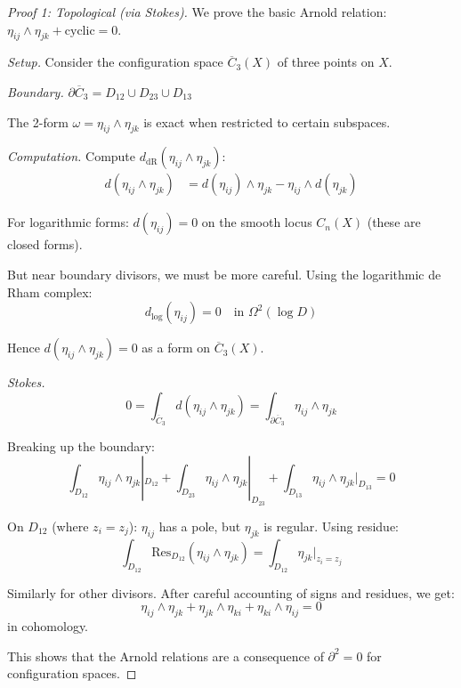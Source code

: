 \begin{proof}[Proof 1: Topological (via Stokes)]
We prove the basic Arnold relation: $\eta_{ij} \wedge \eta_{jk} + \text{cyclic} = 0$.

\emph{Setup.} Consider the configuration space $\overline{C}_3(X)$ of three points on $X$.

\emph{Boundary.} $\partial\overline{C}_3 = D_{12} \cup D_{23} \cup D_{13}$

The 2-form $\omega = \eta_{ij} \wedge \eta_{jk}$ is exact when restricted to certain subspaces.

\emph{Computation.} Compute $d_{\text{dR}}(\eta_{ij} \wedge \eta_{jk})$:
\begin{align*}
d(\eta_{ij} \wedge \eta_{jk}) &= d(\eta_{ij}) \wedge \eta_{jk} - \eta_{ij} \wedge d(\eta_{jk})
\end{align*}

For logarithmic forms: $d(\eta_{ij}) = 0$ on the smooth locus $C_n(X)$ (these are closed forms).

But near boundary divisors, we must be more careful. Using the logarithmic de Rham complex:
\[d_{\log}(\eta_{ij}) = 0 \quad \text{in } \Omega^2(\log D)\]

Hence $d(\eta_{ij} \wedge \eta_{jk}) = 0$ as a form on $\overline{C}_3(X)$.

\emph{Stokes.}
\[0 = \int_{\overline{C}_3} d(\eta_{ij} \wedge \eta_{jk}) = \int_{\partial\overline{C}_3} \eta_{ij} \wedge \eta_{jk}\]

Breaking up the boundary:
\[\int_{D_{12}} \eta_{ij} \wedge \eta_{jk}|_{D_{12}} + \int_{D_{23}} \eta_{ij} \wedge \eta_{jk}|_{D_{23}} + \int_{D_{13}} \eta_{ij} \wedge \eta_{jk}|_{D_{13}} = 0\]

On $D_{12}$ (where $z_i = z_j$): $\eta_{ij}$ has a pole, but $\eta_{jk}$ is regular.
Using residue:
\[\int_{D_{12}} \text{Res}_{D_{12}}(\eta_{ij} \wedge \eta_{jk}) = \int_{D_{12}} \eta_{jk}|_{z_i=z_j}\]

Similarly for other divisors. After careful accounting of signs and residues, we get:
\[\eta_{ij} \wedge \eta_{jk} + \eta_{jk} \wedge \eta_{ki} + \eta_{ki} \wedge \eta_{ij} = 0\]
in cohomology.

This shows that the Arnold relations are a consequence of $\partial^2 = 0$ for configuration spaces.
\end{proof}

